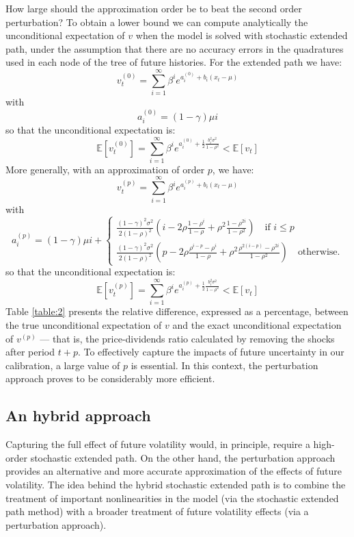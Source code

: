 \documentclass[a4paper,12pt]{amsart}
\begin{document}
How large should the approximation order be to beat the second order
perturbation? To obtain a lower bound we can compute analytically the
unconditional expectation of $v$ when the model is solved with
stochastic extended path, under the assumption that there
are no accuracy errors in the quadratures used in each node of the tree
of future histories. For the extended path we have:
\[
   v_t^{(0)} = \sum_{i=1}^\infty \beta^i e^{a_i^{(0)} + b_i (x_t-\mu)}
\]
with
\[
   a_i^{(0)} = (1-\gamma)\mu i
\]
so that the unconditional expectation is:
\[
   \mathbb E\left[v_t^{(0)}\right] = \sum_{i=1}^\infty \beta^ie^{a_i^{(0)} + \frac{1}{2}\frac{b_i^2\sigma^2}{1-\rho^2}} < \mathbb E\left[v_t\right]
\]
More generally, with an approximation of order $p$, we have:
\[
   v_t^{(p)} = \sum_{i=1}^\infty \beta^i e^{a_i^{(p)} + b_i (x_t-\mu)}
\]
with
\[
   a_i^{(p)} = (1-\gamma)\mu i +
   \begin{cases}
      \frac{(1-\gamma)^2\sigma^2}{2(1-\rho)^2}\left( i - 2\rho\frac{1-\rho^i}{1-\rho} + \rho^2\frac{1-\rho^{2i}}{1-\rho^2} \right)\quad\text{if }i\leq p \\
      \frac{(1-\gamma)^2\sigma^2}{2(1-\rho)^2}\left( p - 2\rho\frac{\rho^{i-p}-\rho^i}{1-\rho} + \rho^2\frac{\rho^{2(i-p)}-\rho^{2i}}{1-\rho^2} \right)\quad\text{otherwise.}
   \end{cases}
\]
so that the unconditional expectation is:
\[
   \mathbb E\left[v_t^{(p)}\right] = \sum_{i=1}^\infty \beta^ie^{a_i^{(p)} + \frac{1}{2}\frac{b_i^2\sigma^2}{1-\rho^2}} < \mathbb E\left[v_t\right]
\]
Table \ref{table:2} presents the relative difference, expressed as a
percentage, between the true unconditional expectation of \(v\) and
the exact unconditional expectation of \(v^{(p)}\) — that is, the
price-dividends ratio calculated by removing the shocks after
period \(t+p\). To effectively capture the impacts of future
uncertainty in our calibration, a large value of \(p\) is
essential. In this context, the perturbation approach proves to be
considerably more efficient.\newline

\subsection{An hybrid approach}

Capturing the full effect of future volatility would, in principle,
require a high-order stochastic extended path. On the other hand, the
perturbation approach provides an alternative and more accurate
approximation of the effects of future volatility. The idea behind the
hybrid stochastic extended path is to combine the treatment of
important nonlinearities in the model (via the stochastic extended
path method) with a broader treatment of future volatility effects
(via a perturbation approach).\newline
\end{document}
